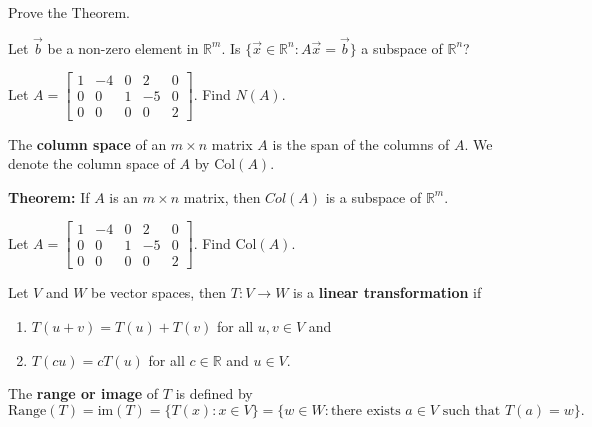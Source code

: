 \documentclass[12pt,letterpaper]{article}
\begin{document}
\begin{enumerate}

\Problem Prove the Theorem.

\vfill

\Problem Let $\vec{b}$ be a non-zero element in $\mathbb{R}^m$. Is $\{ \vec{x} \in \mathbb{R}^n : A\vec{x}=\vec{b}\}$ a subspace of $\mathbb{R}^n$?

\vfill

\Problem Let $A=\begin{bmatrix} 1 & -4 & 0 & 2 &0\\  0 & 0 & 1 & -5 & 0\\ 0 & 0 & 0 & 0 & 2 \end{bmatrix}$. Find $N(A)$.



\vfill 

\newpage

\begin{defn}
	The {\bf column space} of an $m\times n$ matrix $A$ is the span of the columns of $A$. We denote the column space of $A$ by $\text{Col}(A)$.
\end{defn}

{\bf Theorem:} If $A$ is an $m\times n$ matrix, then $Col(A)$ is a subspace of $\mathbb{R}^m$.

\Problem Let $A=\begin{bmatrix} 1 & -4 & 0 & 2 &0\\  0 & 0 & 1 & -5 & 0\\ 0 & 0 & 0 & 0 & 2 \end{bmatrix}$. Find $\text{Col}(A)$.

\newpage

\begin{defn}
Let $V$ and $W$ be vector spaces, then $T: V \to W$ is a {\bf linear transformation} if 
\begin{enumerate}
	\item $T(u+v)=T(u)+T(v)$ for all $u, v \in V$ and 
	\item $T(c u)=c T(u)$ for all $c \in \mathbb{R}$ and $u \in V$.
\end{enumerate}
\end{defn}

\begin{defn}
	The {\bf range or image } of $T$ is defined by $$\text{Range}(T)=\text{im}(T)=\{T(x): x \in V\}=\{w\in W: \text{there exists } a \in V \text{ such that } T(a)=w\}.$$ 
	

\end{defn}
\end{enumerate}
\end{document}

